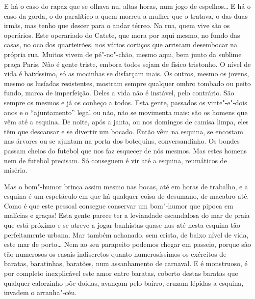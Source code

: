 E há o caso do rapaz que se olhava nu, altas horas, num jogo de
espelhos\ldots{} E há o caso da gorda, o do paralítico a quem morreu a mulher
que o tratava, o das duas irmãs, mas tenho que descer para o andar
térreo. Na rua, quem vive são os operários. Este operariado do Catete,
que mora por aqui mesmo, no fundo das casas, no oco dos quarteirões, nos
vários cortiços que arriscam desembocar na própria rua. Muitos vivem de
pé"-no"-chão, mesmo aqui, bem junto da sublime praça Paris. Não é gente
triste, embora todos sejam de físico tristonho. O nível de vida é
baixíssimo, só as mocinhas se disfarçam mais. Os outros, mesmo os
jovens, mesmo os lusíadas resistentes, mostram sempre qualquer ombro
tombado ou peito fundo, marca de imperfeição. Deles a vida não é
instável, pelo contrário. São sempre os mesmos e já os conheço a todos.
Esta gente, passados os vinte"-e"-dois anos e o ``ajuntamento'' legal ou
não, não se movimenta mais: são os homens que vêm até a esquina. De
noite, após a janta, ou nos domingos de camisa limpa, eles têm que
descansar e se divertir um bocado. Então vêm na esquina, se encostam nas
árvores ou se ajuntam na porta dos botequins, conversandinho. Os bondes
passam cheios do futebol que nos faz esquecer de nós mesmos. Mas estes
homens nem de futebol precisam. Só conseguem é vir até a esquina,
reumáticos de miséria.

Mas o bom"-humor brinca assim mesmo nas bocas, até em horas de trabalho,
e a esquina é um espetáculo em que há qualquer coisa de desumano, de
macabro até. Como é que este pessoal consegue conservar um bom"-humor que
pipoca em malícias e graças! Esta gente parece ter a leviandade
escandalosa do mar de praia que está próximo e se atreve a jogar
banhistas quase nus até nesta esquina tão perfeitamente urbana. Mar
também achanado, sem crista, de baixo nível de vida, este mar de
porto\ldots{} Nem ao seu parapeito podemos chegar em passeio, porque são tão
numerosos os casais indiscretos quanto numerosíssimos os exércitos de
baratas, baratinhas, baratões, num assanhamento de carnaval. E é
monstruoso, é por completo inexplicável este amor entre baratas, coberto
destas baratas que qualquer calorzinho põe doidas, avançam pelo bairro,
cruzam lépidas a esquina, invadem o arranha"-céu.

